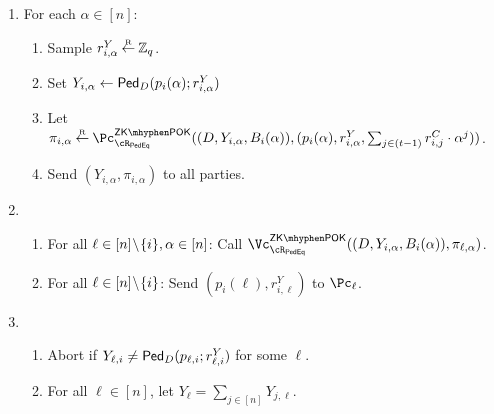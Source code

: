 \begin{protocol}
\begin{enumerate}
			\item 	For each $\alpha\in [n]$:  
			
			
			
			
			
			
			\begin{enumerate}
					
					\item Sample  $r_{i,\alpha}^Y \mathbin{\stackrel{\mbox{\tiny R}}{\leftarrow}}\mathbb{Z}_q$.
					
					\item      Set  $Y_{i,\alpha} \leftarrow  \mathsf{Ped}_D(p_i(\alpha);r^Y_{i,\alpha})$
					
					\item Let $\pi_{i,\alpha} \getsr \pZKPOK{\rPedEq}((D,Y_{i,\alpha}, B_i(\alpha)),(p_i(\alpha),r^Y_{i,\alpha} , \sum_{j\in (t-1)} r_{i,j}^C \cdot \alpha^j))$.   
					
				
		
				
					\item Send $(Y_{i,\alpha},\pi_{i,\alpha})$ to all parties. 
				
			\end{enumerate}
			
			
		
			
			
			\item {}			
			\begin{enumerate}
				\item   For all  $\ell \in [n]\!\setminus\!\{i\}, \alpha\in [n]$:  Call $\vZKPOK{\rPedEq}((D,Y_{i,\alpha}, B_i(\alpha)),\pi_{\ell,\alpha})$.
				
				\item  For all $\ell\in [n]\!\setminus\!\{i\}$:  Send $(p_i(\ell),r^Y_{i,\ell})$ to $\Pc_\ell$.
				
			\end{enumerate}
			
			
			\item
			
			\begin{enumerate}
				\item Abort    if $Y_{\ell,i} \neq \mathsf{Ped}_D(p_{\ell,i};r^Y_{\ell,i})$ for some $\ell$.
				
				
				\item   For all $\ell \in [n]$, let $Y_\ell= \sum_{j\in [n]} Y_{j,\ell}$.  
				

\end{enumerate}
\end{enumerate}
\end{protocol}

